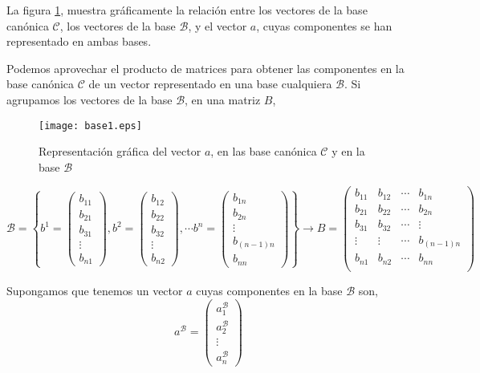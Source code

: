La figura \ref{fig:base1}, muestra gráficamente la relación entre los vectores de la base canónica $\mathcal{C}$, los vectores de la base $\mathcal{B}$, y el vector $a$, cuyas componentes se han representado en ambas bases.

Podemos aprovechar el producto de matrices para obtener las componentes en la base canónica $\mathcal{C}$ de un vector representado en una base cualquiera $\mathcal{B}$. Si agrupamos los vectores de la base $\mathcal{B}$, en una matriz $B$,

\begin{figure}[h]
\centering
\texttt{[image: base1.eps]}
\caption{Representación gráfica del vector $a$, en las base canónica $\mathcal{C}$ y en la base $\mathcal{B}$}
\label{fig:base1}
\end{figure}

\begin{equation*}
\mathcal{B}=\left\lbrace b^1=\begin{pmatrix}
b_{11}\\
b_{21}\\
b_{31}\\
\vdots \\
b_{n1}
\end{pmatrix},b^2=\begin{pmatrix}
b_{12}\\
b_{22}\\
b_{32}\\
\vdots \\
b_{n2}
\end{pmatrix},
\cdots
b^n=\begin{pmatrix}
b_{1n}\\
b_{2n}\\
\vdots \\
b_{(n-1)n}\\
b_{nn}
\end{pmatrix} \right\rbrace \rightarrow
B=\begin{pmatrix}
b_{11}&b_{12}& \cdots & b_{1n}\\
b_{21}&b_{22}& \cdots & b_{2n}\\
b_{31}&b_{32}& \cdots & \vdots \\
\vdots & \vdots & \cdots &  b_{(n-1)n}\\
b_{n1}&b_{n2}& \cdots & b_{nn}\\
\end{pmatrix}
\end{equation*}

Supongamos que tenemos un vector $a$ cuyas componentes en la base $\mathcal{B}$ son,
\begin{equation*}
a^{\mathcal{B}}=\begin{pmatrix}
a_1^{\mathcal{B}}\\
a_2^{\mathcal{B}}\\
\vdots \\
a_n^{\mathcal{B}}
\end{pmatrix}
\end{equation*}

